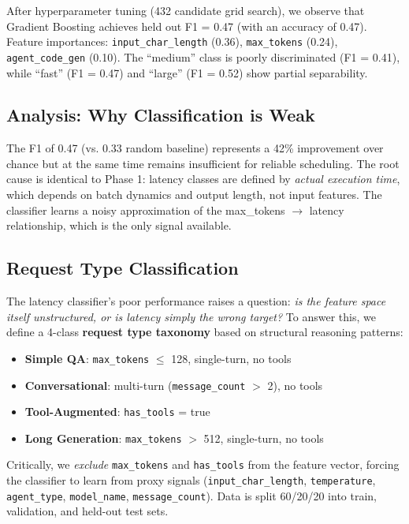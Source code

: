 \documentclass[conference]{IEEEtran}
\begin{document}
After hyperparameter tuning (432  candidate grid search), we observe that Gradient Boosting achieves held out F1 = 0.47 (with an accuracy of 0.47). Feature importances: \texttt{input\_char\_length} (0.36), \texttt{max\_tokens} (0.24), \texttt{agent\_code\_gen} (0.10). The ``medium'' class is poorly discriminated (F1 = 0.41), while ``fast'' (F1 = 0.47) and ``large'' (F1 = 0.52) show partial separability.

\subsection{Analysis: Why Classification is Weak}

The F1 of 0.47 (vs. 0.33 random baseline) represents a 42\% improvement over chance but at the same time remains insufficient for reliable scheduling. The root cause is identical to Phase 1: latency classes are defined by \textit{actual execution time}, which depends on batch dynamics and output length, not input features. The classifier learns a noisy approximation of the max\_tokens $\rightarrow$ latency relationship, which is the only signal available.

\subsection{Request Type Classification}

The latency classifier's poor performance raises a question: \textit{is the feature space itself unstructured, or is latency simply the wrong target?} To answer this, we define a 4-class \textbf{request type taxonomy} based on structural reasoning patterns:

\begin{itemize}
    \item \textbf{Simple QA}: \texttt{max\_tokens} $\leq$ 128, single-turn, no tools
    \item \textbf{Conversational}: multi-turn (\texttt{message\_count} $>$ 2), no tools
    \item \textbf{Tool-Augmented}: \texttt{has\_tools} = true
    \item \textbf{Long Generation}: \texttt{max\_tokens} $>$ 512, single-turn, no tools
\end{itemize}

Critically, we \textit{exclude} \texttt{max\_tokens} and \texttt{has\_tools} from the feature vector, forcing the classifier to learn from proxy signals (\texttt{input\_char\_length}, \texttt{temperature}, \texttt{agent\_type}, \texttt{model\_name}, \texttt{message\_count}). Data is split 60/20/20 into train, validation, and held-out test sets.
\end{document}
